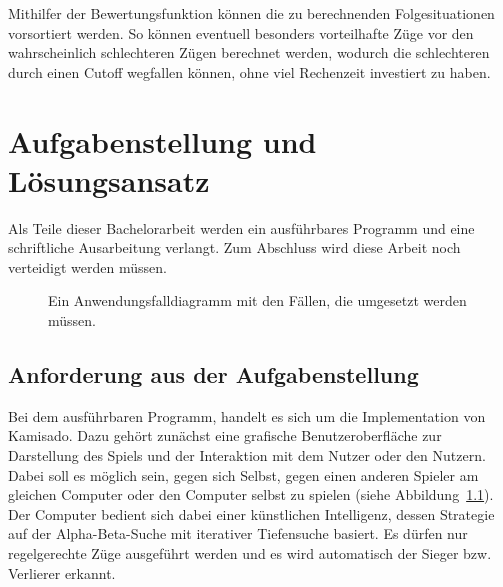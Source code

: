 \documentclass[
	12pt,
	halfparskip,
	a4paper,
	abstract,
	bibliography=totoc,
	liststotoc
]{scrreprt}
\begin{document}
Mithilfer der Bewertungsfunktion können die zu berechnenden Folgesituationen vorsortiert werden. So können eventuell besonders vorteilhafte Züge vor den wahrscheinlich schlechteren Zügen berechnet werden, wodurch die schlechteren durch einen Cutoff wegfallen können, ohne viel Rechenzeit investiert zu haben. \citep[S. 169]{ai} 

\chapter{Aufgabenstellung und Lösungsansatz}

Als Teile dieser Bachelorarbeit werden ein ausführbares Programm und eine schriftliche Ausarbeitung verlangt. Zum Abschluss wird diese Arbeit noch verteidigt werden müssen.

\begin{figure}[htb]
\begin{center}
\end{center}
\caption{Ein Anwendungsfalldiagramm mit den Fällen, die umgesetzt werden müssen.}
\label{fig:usecase}
\end{figure}

\section{Anforderung aus der Aufgabenstellung}

Bei dem ausführbaren Programm, handelt es sich um die Implementation von Kamisado. Dazu gehört zunächst eine grafische Benutzeroberfläche zur Darstellung des Spiels und der Interaktion mit dem Nutzer oder den Nutzern. Dabei soll es möglich sein, gegen sich Selbst, gegen einen anderen Spieler am gleichen Computer oder den Computer selbst zu spielen (siehe Abbildung~\ref{fig:usecase}). Der Computer bedient sich dabei einer künstlichen Intelligenz, dessen Strategie auf der Alpha-Beta-Suche mit iterativer Tiefensuche basiert. Es dürfen nur regelgerechte Züge ausgeführt werden und es wird automatisch der Sieger bzw. Verlierer erkannt.
\end{document}
